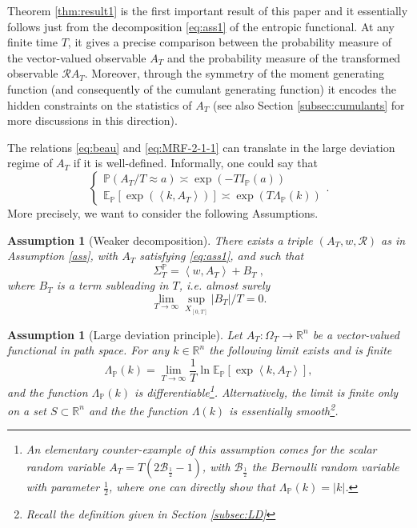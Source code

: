 \documentclass[a4paper,11pt]{article}
\numberwithin{equation}{section}
\newtheorem{assumption}[theorem]{Assumption}
\begin{document}
Theorem \ref{thm:result1} is the first important result of this paper and it essentially follows just from the decomposition \eqref{eq:ass1} of the entropic functional. At any finite time $T$, it gives a precise comparison between the probability measure of the vector-valued observable $A_T$ and the probability measure of the transformed observable $\mathcal{R}A_T$. Moreover, through the symmetry of the moment generating function (and consequently of the cumulant generating function) it encodes the hidden constraints on the statistics of $A_T$ (see also Section \ref{subsec:cumulants} for more discussions in this direction). 


The relations \eqref{eq:beau} and \eqref{eq:MRF-2-1-1} can translate in the large deviation regime of $A_T$ if it is well-defined. Informally, one could say that
  \begin{equation}
\begin{cases}\label{eq:Ldev}
\mathbb{P} \left( A_T /T \approx a\right) \asymp \exp\left(-TI_{\mathbb{P}} ( a )\right)\\
\mathbb{E}_{\mathbb{P}}\left[\exp\left(\left\langle k,A_T\right\rangle \right)\right]\asymp\exp\left(T\Lambda_{\mathbb{P}}(k)\right)
\end{cases}.
\end{equation}
More precisely, we want to consider the following Assumptions.
\begin{assumption}[Weaker decomposition]\label{ass_weak}
  There exists a triple $(A_T, w, \mathcal{R})$ as in Assumption \ref{ass}, with $A_T$ satisfying \eqref{eq:ass1}, and such that 
  \begin{equation}\label{eq:weakdec}
       \varSigma_{T}^{\mathbb{P}}=\left\langle w, A_T\right\rangle + B_T \; ,
  \end{equation}
  where $B_T$ is a term subleading in $T$, i.e. almost surely
  \begin{equation}\label{eq:subleading}
     \lim_{T\to \infty}\sup_{X_{\left[0,T\right]}}|B_T|/T=0 .
  \end{equation}
\end{assumption}
\begin{assumption}[Large deviation principle]\label{ass:ld}
    Let $A_T: \Omega_T \to \mathbb{R}^n$ be a vector-valued functional in path space. For any $k \in \mathbb{R}^n$ the following limit exists and is finite
   \begin{equation}\label{eq:cumul}
      \Lambda_{\mathbb{P}}(k) = \lim_{T \to \infty} \frac{1}{T}\ln \mathbb{E}_\mathbb{P} \left[\exp\left\langle k,A_T\right\rangle \right] ,
   \end{equation}
   and the function $\Lambda_{\mathbb{P}}(k)$ is differentiable\footnote{An elementary counter-example of this assumption comes for the scalar random variable $A_{T}=T\left(2\mathcal{B}_{\frac{1}{2}}-1\right)$, 
with $\mathcal{B}_{\frac{1}{2}}$ the Bernoulli random variable with
parameter $\frac{1}{2}$, where one can directly show that $ \Lambda_{\mathbb{P}}(k)=\left|k\right|$.}. Alternatively, the limit is finite only on a set $S \subset \mathbb{R}^n$ and the the function $\Lambda(k)$ is essentially smooth\footnote{Recall the definition given in Section \ref{subsec:LD}}.
\end{assumption}
\end{document}
